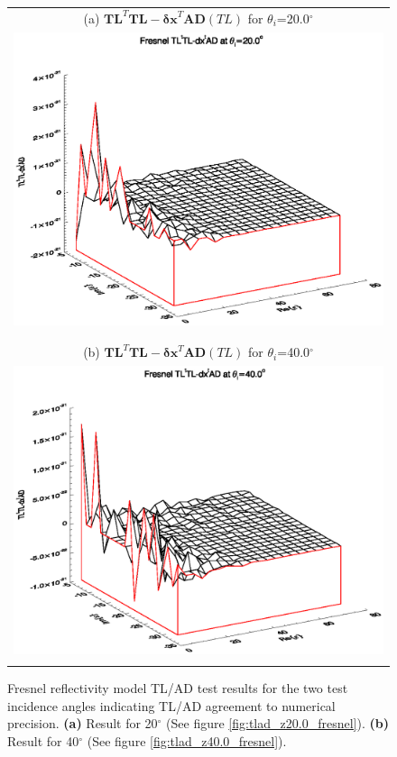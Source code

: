 \begin{figure}[htp]
  \centering
  \begin{tabular}{c}
    \textsf{(a) $\mathbf{TL}^{T}\mathbf{TL} - \mathbf{\delta x}^{T}\mathbf{AD}(TL)$ for $\theta_i$=20.0$^\circ$}\\
    \hspace{1em}\includegraphics[bb=115 240 508 525,clip,scale=0.8]{graphics/Fresnel/TLAD/TLtTL-dxtAD_z20.0.eps}\\\\\\
    \textsf{(b) $\mathbf{TL}^{T}\mathbf{TL} - \mathbf{\delta x}^{T}\mathbf{AD}(TL)$ for $\theta_i$=40.0$^\circ$}\\
    \includegraphics[bb=105 240 508 525,clip,scale=0.8]{graphics/Fresnel/TLAD/TLtTL-dxtAD_z40.0.eps}\\\\
  \end{tabular}
  \caption{Fresnel reflectivity model TL/AD test results for the two test incidence angles indicating TL/AD agreement to numerical precision. \textbf{(a)} Result for 20$^{\circ}$ (See figure \ref{fig:tlad_z20.0_fresnel}). \textbf{(b)} Result for 40$^{\circ}$ (See figure \ref{fig:tlad_z40.0_fresnel}).}
  \label{fig:tlad_test_fresnel}
\end{figure}

